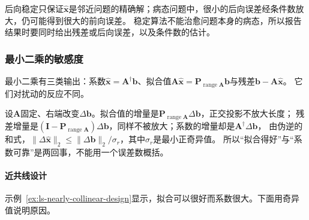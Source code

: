 后向稳定只保证$\widehat{\bm x}$是邻近问题的精确解；病态问题中，很小的后向误差经条件数放大，仍可能得到很大的前向误差。
稳定算法不能治愈问题本身的病态，所以报告结果时要同时给出残差或后向误差，以及条件数的估计。

\subsubsection{最小二乘的敏感度}
\label{sec:ls-ls-regularization-sensitivity}
\label{sec:ls-ordinary-ls-sensitivity}

最小二乘有三类输出：系数$\hat{\bm x}=\bm A^\dagger\bm b$、拟合值$\bm A\hat{\bm x}=\bm P_{\operatorname{range}\bm A}\bm b$与残差$\bm b-\bm A\hat{\bm x}$。
它们对扰动的反应不同。

设$\bm A$固定、右端改变$\Delta\bm b$。拟合值的增量是$\bm P_{\operatorname{range}\bm A}\Delta\bm b$，正交投影不放大长度；
残差增量是$(\bm I-\bm P_{\operatorname{range}\bm A})\Delta\bm b$，同样不被放大；系数的增量却是$\bm A^\dagger\Delta\bm b$，
由伪逆的和式，$\lVert\Delta\hat{\bm x}\rVert_2\leq\lVert\Delta\bm b\rVert_2/\sigma_r$，其中$\sigma_r$是最小正奇异值。
所以“拟合得好”与“系数可靠”是两回事，不能用一个误差数概括。

\paragraph{近共线设计}

示例~\ref{ex:ls-nearly-collinear-design}显示，拟合可以很好而系数很大。下面用奇异值说明原因。

